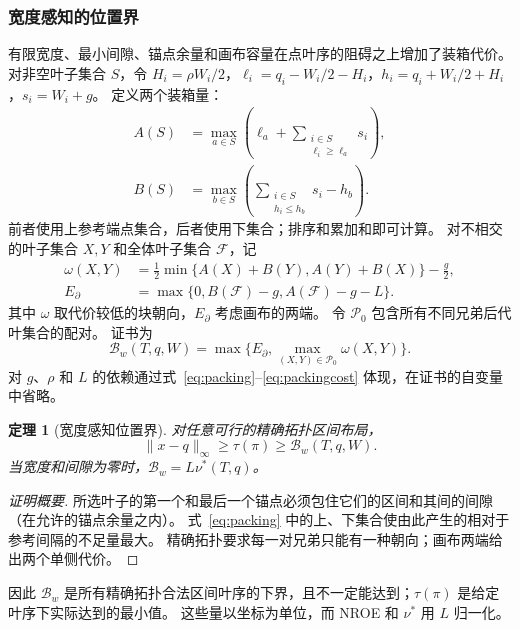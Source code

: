 \documentclass[fontset=none,zihao=5,a4paper]{ctexart}
\newtheorem{theorem}{定理}
\begin{document}
\subsubsection{宽度感知的位置界}
有限宽度、最小间隙、锚点余量和画布容量在点叶序的阻碍之上增加了装箱代价。
对非空叶子集合 $S$，令 $H_i=\rho W_i/2$，$\ell_i=q_i-W_i/2-H_i$，$h_i=q_i+W_i/2+H_i$，$s_i=W_i+g$。
定义两个装箱量：
\begin{equation}\label{eq:packing}
\begin{aligned}
 A(S)&=\max_{a\in S}\left(\ell_a+\sum_{\substack{i\in S\\\ell_i\ge\ell_a}}s_i\right),\\
 B(S)&=\max_{b\in S}\left(\sum_{\substack{i\in S\\h_i\le h_b}}s_i-h_b\right).
\end{aligned}
\end{equation}
前者使用上参考端点集合，后者使用下集合；排序和累加和即可计算。
对不相交的叶子集合 $X,Y$ 和全体叶子集合 $\mathcal{F}$，记
\begin{equation}\label{eq:packingcost}
\begin{aligned}
 \omega(X,Y)&=\tfrac12\min\{A(X)+B(Y),A(Y)+B(X)\}-\tfrac g2,\\
 E_\partial&=\max\{0,B(\mathcal{F})-g,A(\mathcal{F})-g-L\}.
\end{aligned}
\end{equation}
其中 $\omega$ 取代价较低的块朝向，$E_\partial$ 考虑画布的两端。
令 $\mathcal{P}_0$ 包含所有不同兄弟后代叶集合的配对。
证书为
\begin{equation}\label{eq:bwdef}
 \mathcal{B}_w(T,q,W)=\max\{E_\partial,\max_{(X,Y)\in\mathcal{P}_0}\omega(X,Y)\}.
\end{equation}
对 $g$、$\rho$ 和 $L$ 的依赖通过式~\ref{eq:packing}–\ref{eq:packingcost} 体现，在证书的自变量中省略。
\begin{theorem}[宽度感知位置界]\label{thm:width}
对任意可行的精确拓扑区间布局，
\begin{equation}\label{eq:widthbound}
 \|x-q\|_\infty\ge\tau(\pi)\ge\mathcal{B}_w(T,q,W).
\end{equation}
当宽度和间隙为零时，$\mathcal{B}_w=L\nu^*(T,q)$。
\end{theorem}
\begin{proof}[证明概要]
所选叶子的第一个和最后一个锚点必须包住它们的区间和其间的间隙（在允许的锚点余量之内）。
式~\ref{eq:packing} 中的上、下集合使由此产生的相对于参考间隔的不足量最大。
精确拓扑要求每一对兄弟只能有一种朝向；画布两端给出两个单侧代价。
\end{proof}
因此 $\mathcal{B}_w$ 是所有精确拓扑合法区间叶序的下界，且不一定能达到；$\tau(\pi)$ 是给定叶序下实际达到的最小值。
这些量以坐标为单位，而 NROE 和 $\nu^*$ 用 $L$ 归一化。
\end{document}
